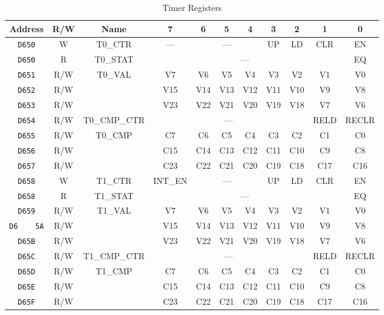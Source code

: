 \begin{table}[ht]
    \begin{center}
        \begin{tabular}{|c|c|c|c|c|c|c|c|c|c|c|} \hline
            Address & R/W & Name & 7 & 6 & 5 & 4 & 3 & 2 & 1 & 0 \\\hline\hline
			\verb+D650+ & W & T0\_CTR & --- & \multicolumn{3}{|c|}{---} & UP & LD & CLR & EN \\ \hline
			\verb+D650+ & R & T0\_STAT & \multicolumn{7}{|c|}{---} & EQ \\ \hline

			\verb+D651+ & R/W & \multirow{3}{*}{T0\_VAL} & V7 & V6 & V5 & V4 & V3 & V2 & V1 & V0 \\ \cline{1-2}\cline{4-11}
			\verb+D652+ & R/W &  & V15 & V14 & V13 & V12 & V11 & V10 & V9 & V8 \\ \cline{1-2}\cline{4-11}
			\verb+D653+ & R/W &  & V23 & V22 & V21 & V20 & V19 & V18 & V7 & V6 \\ \hline

			\verb+D654+ & R/W & T0\_CMP\_CTR & \multicolumn{6}{|c|}{---} & RELD & RECLR \\ \hline

			\verb+D655+ & R/W & \multirow{3}{*}{T0\_CMP} & C7 & C6 & C5 & C4 & C3 & C2 & C1 & C0 \\ \cline{1-2}\cline{4-11}
			\verb+D656+ & R/W &  & C15 & C14 & C13 & C12 & C11 & C10 & C9 & C8 \\ \cline{1-2}\cline{4-11}
			\verb+D657+ & R/W &  & C23 & C22 & C21 & C20 & C19 & C18 & C17 & C16 \\ \hline\hline

			\verb+D658+ & W & T1\_CTR & INT\_EN & \multicolumn{3}{|c|}{---} & UP & LD & CLR & EN \\ \hline
			\verb+D658+ & R & T1\_STAT & \multicolumn{7}{|c|}{---} & EQ \\ \hline

			\verb+D659+ & R/W & \multirow{3}{*}{T1\_VAL} & V7 & V6 & V5 & V4 & V3 & V2 & V1 & V0 \\ \cline{1-2}\cline{4-11}
			\verb+D6    5A+ & R/W &  & V15 & V14 & V13 & V12 & V11 & V10 & V9 & V8 \\ \cline{1-2}\cline{4-11}
			\verb+D65B+ & R/W &  & V23 & V22 & V21 & V20 & V19 & V18 & V7 & V6 \\ \hline

			\verb+D65C+ & R/W & T1\_CMP\_CTR & \multicolumn{6}{|c|}{---} & RELD & RECLR \\ \hline

			\verb+D65D+ & R/W & \multirow{3}{*}{T1\_CMP} & C7 & C6 & C5 & C4 & C3 & C2 & C1 & C0 \\ \cline{1-2}\cline{4-11}
			\verb+D65E+ & R/W &  & C15 & C14 & C13 & C12 & C11 & C10 & C9 & C8 \\ \cline{1-2}\cline{4-11}
			\verb+D65F+ & R/W &  & C23 & C22 & C21 & C20 & C19 & C18 & C17 & C16 \\ \hline
        \end{tabular}
    \end{center}
    \caption{Timer Registers}
    \label{tab:timer_reg}
\end{table}

